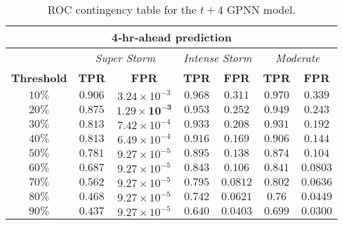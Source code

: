 \begin{table}[ht]
	\centering
	\caption{ROC contingency table for the $t+4$ GPNN model.}
	\label{table:rocgpnn4h}
	\begin{tabular}
		{c| c c | c c | c c}
		\hline
		\multicolumn{7}{c}{\textbf{4‐hr‐ahead prediction}} \\ 
		\hline
		 & \multicolumn{2}{c}{\textit{Super Storm}} & \multicolumn{2}{c}{\textit{Intense Storm}} & \multicolumn{2}{c}{\textit{Moderate}} \\ 
		\hline
		\textbf{Threshold} & \textbf{TPR} & \textbf{FPR} & \textbf{TPR} & \textbf{FPR} & \textbf{TPR} & \textbf{FPR} \\ 
		\hline
		$10\%$ & $0.906$ & $3.24\times10^{-3}$ & $0.968$ & $0.311$ & $0.970$ & $0.339$ \\ 
		$20\%$ & $\mathbf{0.875}$ & $\mathbf{1.29\times10^{-3}}$ & $0.953$ & $0.252$ & $0.949$ & $0.243$ \\ 
		$30\%$ & $0.813$ & $7.42\times10^{-4}$ & $0.933$ & $0.208$ & $0.931$ & $0.192$ \\ 
		$40\%$ & $0.813$ & $6.49\times10^{-4}$ & $\mathbf{0.916}$ & $\mathbf{0.169}$ & $0.906$ & $0.144$ \\ 
		$50\%$ & $0.781$ & $9.27\times10^{-5}$ & $0.895$ & $0.138$ & $\mathbf{0.874}$ & $\mathbf{0.104}$ \\ 
		$60\%$ & $0.687$ & $9.27\times10^{-5}$ & $0.843$ & $0.106$ & $0.841$ & $0.0803$ \\ 
		$70\%$ & $0.562$ & $9.27\times10^{-5}$ & $0.795$ & $0.0812$ & $0.802$ & $0.0636$ \\ 
		$80\%$ & $0.468$ & $9.27\times10^{-5}$ & $0.742$ & $0.0621$ & $0.76$ & $0.0449$ \\ 
		$90\%$ & $0.437$ & $9.27\times10^{-5}$ & $0.640$ & $0.0403$ & $0.699$ & $0.0300$\\
		\hline
	\end{tabular}
\end{table}

